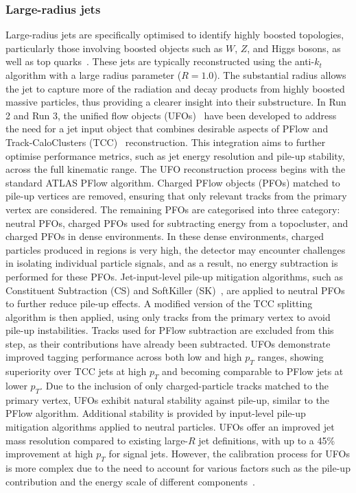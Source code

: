         \subsubsection{Large-radius jets}
            Large-radius jets are specifically optimised to identify highly boosted topologies, particularly those involving boosted objects 
            such as \(W\), \(Z\), and Higgs bosons, as well as top quarks~\cite{JETM-2018-03}. These jets are typically reconstructed using the anti-\(k_t\) 
            algorithm with a large radius parameter (\(R = 1.0\)). The substantial radius allows the jet to capture more of the 
            radiation and decay products from highly boosted massive particles, thus providing a clearer insight into their substructure.
            In Run 2 and Run 3, the unified flow objects (UFOs)~\cite{JETM-2018-02,JETM-2018-06} have been developed to address the need for a jet input object that 
            combines desirable aspects of PFlow and Track-CaloClusters (TCC)~\cite{JETM-2018-02} reconstruction. This integration aims to further optimise 
            performance metrics, such as jet energy resolution and pile-up stability, across the full kinematic range.
            The UFO reconstruction process begins with the standard ATLAS PFlow algorithm. Charged PFlow objects (PFOs) matched 
            to pile-up vertices are removed, ensuring that only relevant tracks from the primary vertex are considered.
            The remaining PFOs are categorised into three category: neutral PFOs, charged PFOs used for subtracting energy from a topocluster,
            and charged PFOs in dense environments. In these dense environments, charged particles produced in regions is very high, 
            the detector may encounter challenges in isolating individual particle signals, and as a result, 
            no energy subtraction is performed for these PFOs.
            Jet-input-level pile-up mitigation algorithms, such as Constituent Subtraction (CS) and SoftKiller (SK)~\cite{ATLAS-CONF-2017-065}, 
            are applied to neutral PFOs to further reduce pile-up effects. A modified version of the TCC splitting algorithm is 
            then applied, using only tracks from the primary vertex to avoid pile-up instabilities. Tracks used for PFlow 
            subtraction are excluded from this step, as their contributions have already been subtracted.
            UFOs demonstrate improved tagging performance across both low and high \( p_T \) ranges, showing superiority over 
            TCC jets at high \( p_T \) and becoming comparable to PFlow jets at lower \( p_T \). Due to the inclusion of only 
            charged-particle tracks matched to the primary vertex, UFOs exhibit natural stability against pile-up, similar to 
            the PFlow algorithm. Additional stability is provided by input-level pile-up mitigation algorithms applied to neutral 
            particles. UFOs offer an improved jet mass resolution compared to existing large-\( R \) jet definitions, with up to a 
            45\% improvement at high \( p_T \) for signal jets. 
            However, the calibration process for UFOs is more complex due to the need to account for various factors such as the
            pile-up contribution and the energy scale of different components~\cite{JETM-2023-02}. 


